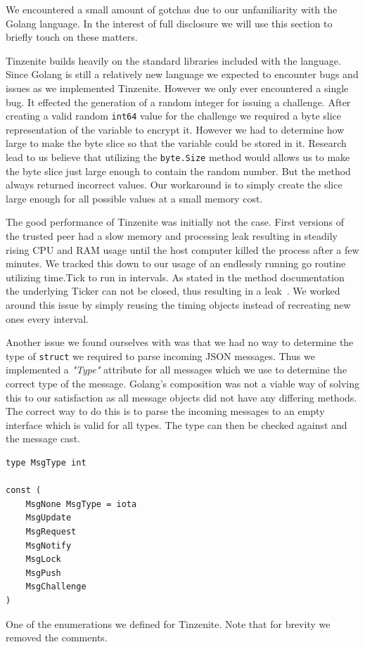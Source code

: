 We encountered a small amount of gotchas due to our unfamiliarity with the Golang language.
In the interest of full disclosure we will use this section to briefly touch on these matters.

Tinzenite builds heavily on the standard libraries included with the language.
Since Golang is still a relatively new language we expected to encounter bugs and issues as we implemented Tinzenite.
However we only ever encountered a single bug.
It effected the generation of a random integer for issuing a challenge.
After creating a valid random \texttt{int64} value for the challenge we required a byte slice representation of the variable to encrypt it.
However we had to determine how large to make the byte slice so that the variable could be stored in it.
Research lead to us believe that utilizing the \texttt{byte.Size} method would allows us to make the byte slice just large enough to contain the random number.
But the method always returned incorrect values.
Our workaround is to simply create the slice large enough for all possible values at a small memory cost.

The good performance of Tinzenite was initially not the case.
First versions of the trusted peer had a slow memory and processing leak resulting in steadily rising CPU and RAM usage until the host computer killed the process after a few minutes.
We tracked this down to our usage of an endlessly running go routine utilizing time.Tick to run in intervals.
As stated in the method documentation the underlying Ticker can not be closed, thus resulting in a leak~\cite{web:site:golang:time:tick}.
We worked around this issue by simply reusing the timing objects instead of recreating new ones every interval.

Another issue we found ourselves with was that we had no way to determine the type of \texttt{struct} we required to parse incoming JSON messages.
Thus we implemented a \textit{"Type"} attribute for all messages which we use to determine the correct type of the message.
Golang's composition was not a viable way of solving this to our satisfaction as all message objects did not have any differing methods.
The correct way to do this is to parse the incoming messages to an empty interface which is valid for all types.
The type can then be checked against and the message cast.

\begin{listing}[htp]
    \begin{lstlisting}[language=golang,firstnumber=0]
type MsgType int

const (
	MsgNone MsgType = iota
	MsgUpdate
	MsgRequest
	MsgNotify
	MsgLock
	MsgPush
	MsgChallenge
)
    \end{lstlisting}
\caption[Golang Enum Example]{One of the enumerations we defined for Tinzenite. Note that for brevity we removed the comments.}
\label{golang:enum_example}
\end{listing}

